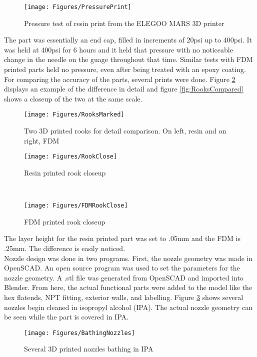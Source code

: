 \begin{figure}[h!]
\centering
\texttt{[image: Figures/PressurePrint]}
\caption{Pressure test of resin print from the ELEGOO MARS 3D printer}
\label{fig:PressurePrint}
\end{figure}
The part was essentially an end cap, filled in increments of 20psi up to 400psi. It was held at 400psi for 6 hours and it held that pressure with no noticeable change in the needle on the guage throughout that time. Similar tests with FDM printed parts held no pressure, even after being treated with an epoxy coating. For comparing the accuracy of the parts, several prints were done. Figure \ref{fig:Rooks} displays an example of the difference in detail and figure \ref{fig:RooksCompared} shows a closeup of the two at the same scale.\clearpage
\begin{figure}[h!]
\centering
\texttt{[image: Figures/RooksMarked]}
\caption{Two 3D printed rooks for detail comparison. On left, resin and on right, FDM}
\label{fig:Rooks}
\end{figure}
\begin{figure*}[h!]
    \centering
    \begin{subfigure}[t]{0.5\textwidth}
        \centering
        \texttt{[image: Figures/RookClose]}
        \caption{Resin printed rook closeup}
    \end{subfigure}%
    ~ 
    \begin{subfigure}[t]{0.5\textwidth}
        \centering
        \texttt{[image: Figures/FDMRookClose]}
        \caption{FDM printed rook closeup}
    \end{subfigure}
    \caption{Rook closeups}
\label{fig:RooksCompared}
\end{figure*}
The layer height for the resin printed part was set to .05mm and the FDM is .25mm. The difference is easily noticed.\\
Nozzle design was done in two programs. First, the nozzle geometry was made in OpenSCAD. An open source program was used to set the parameters for the nozzle geometry. A .stl file was generated from OpenSCAD and imported into Blender. From here, the actual functional parts were added to the model like the hex flatends, NPT fitting, exterior walls, and labelling. Figure \ref{fig:BathingNozzles} shows several nozzles begin cleaned in isopropyl alcohol (IPA). The actual nozzle geometry can be seen while the part is covered in IPA.
\begin{figure}[h!]
\centering
\texttt{[image: Figures/BathingNozzles]}
\caption{Several 3D printed nozzles bathing in IPA}
\label{fig:BathingNozzles}
\end{figure}
